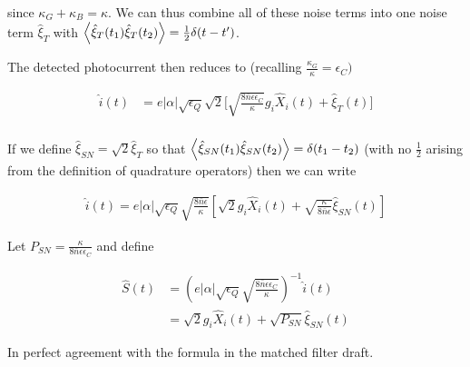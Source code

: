 \documentclass[12pt]{article}
\begin{document}
since $\kappa_G + \kappa_B = \kappa$. We can thus combine all of these noise terms into one noise term $\hat{\xi}_T$ with $\Braket{\hat{\xi}_T(t_1)\hat{\xi}_T(t_2)} = \frac{1}{2}\delta(t-t')$.

The detected photocurrent then reduces to (recalling $\frac{\kappa_G}{\kappa} = \epsilon_C)$

\begin{align}
\hat{i}(t) &= e|\alpha|\sqrt{\epsilon_Q}\sqrt{2}\Bigg[\sqrt{\frac{8\bar{n} \epsilon \epsilon_C}{\kappa}}g_i \hat{X}_i(t) + \hat{\xi}_{T}(t) \Bigg]\\
\end{align}

 If we define $\hat{\xi}_{SN} = \sqrt{2} \hat{\xi}_T$ so that $\Braket{\hat{\xi}_{SN}(t_1)\hat{\xi}_{SN}(t_2)} = \delta(t_1-t_2)$ (with no $\frac{1}{2}$ arising from the definition of quadrature operators) then we can write

\begin{align}
\hat{i}(t) = e|\alpha|\sqrt{\epsilon_Q}\sqrt{\frac{8\bar{n}\epsilon}{\kappa}}\left[\sqrt{2}g_i\hat{X}_i(t) + \sqrt{\frac{\kappa}{8\bar{n}\epsilon}}\hat{\xi}_{SN}(t)\right]
\end{align}

Let $P_{SN} = \frac{\kappa}{8\bar{n}\epsilon\epsilon_C}$ and define

\begin{align}
\hat{S}(t) &= \left(e |\alpha|\sqrt{\epsilon_Q}\sqrt{\frac{8\bar{n}\epsilon\epsilon_C}{\kappa}}\right)^{-1}\hat{i}(t)\\
&= \sqrt{2}g_i\hat{X}_i(t) + \sqrt{P_{SN}}\hat{\xi}_{SN}(t)
\end{align}

In perfect agreement with the formula in the matched filter draft.
\end{document}
